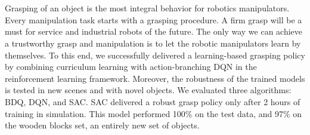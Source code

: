 \chapter{\abstractname}


Grasping of an object is the most integral behavior for robotics manipulators. Every manipulation task starts with a grasping procedure. A firm grasp will be a must for service and industrial robots of the future. The only way we can achieve a trustworthy grasp and manipulation is to let the robotic manipulators learn by themselves. To this end, we successfully delivered a learning-based grasping policy by combining curriculum learning with action-branching DQN in the reinforcement learning framework.
Moreover, the robustness of the trained models is tested in new scenes and with novel objects. We evaluated three algorithms: BDQ, DQN, and SAC. SAC delivered a robust grasp policy only after 2 hours of training in simulation. This model performed 100\% on the test data, and 97\% on the wooden blocks set, an entirely new set of objects.








